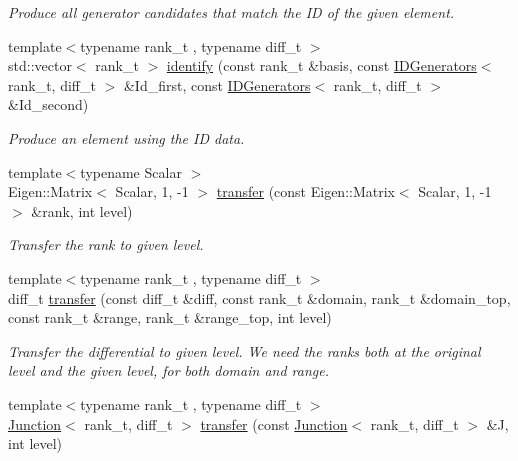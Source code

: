 \begin{DoxyCompactItemize}
\begin{DoxyCompactList}\small\item\em Produce all generator candidates that match the ID of the given element. \end{DoxyCompactList}\item 
{\footnotesize template$<$typename rank\+\_\+t , typename diff\+\_\+t $>$ }\\std\+::vector$<$ rank\+\_\+t $>$ \hyperlink{namespaceMackey_a3fa96ba9b7316a92eca2f5c0bd1cca4d}{identify} (const rank\+\_\+t \&basis, const \hyperlink{classMackey_1_1IDGenerators}{I\+D\+Generators}$<$ rank\+\_\+t, diff\+\_\+t $>$ \&Id\+\_\+first, const \hyperlink{classMackey_1_1IDGenerators}{I\+D\+Generators}$<$ rank\+\_\+t, diff\+\_\+t $>$ \&Id\+\_\+second)
\begin{DoxyCompactList}\small\item\em Produce an element using the ID data. \end{DoxyCompactList}\item 
{\footnotesize template$<$typename Scalar $>$ }\\Eigen\+::\+Matrix$<$ Scalar, 1, -\/1 $>$ \hyperlink{namespaceMackey_a671613d53fc3b0c9c4b115bc8b2797e6}{transfer} (const Eigen\+::\+Matrix$<$ Scalar, 1, -\/1 $>$ \&rank, int level)
\begin{DoxyCompactList}\small\item\em Transfer the rank to given level. \end{DoxyCompactList}\item 
{\footnotesize template$<$typename rank\+\_\+t , typename diff\+\_\+t $>$ }\\diff\+\_\+t \hyperlink{namespaceMackey_ad7524839b58c80d4b2c54827e4833b12}{transfer} (const diff\+\_\+t \&diff, const rank\+\_\+t \&domain, rank\+\_\+t \&domain\+\_\+top, const rank\+\_\+t \&range, rank\+\_\+t \&range\+\_\+top, int level)
\begin{DoxyCompactList}\small\item\em Transfer the differential to given level. We need the ranks both at the original level and the given level, for both domain and range. \end{DoxyCompactList}\item 
{\footnotesize template$<$typename rank\+\_\+t , typename diff\+\_\+t $>$ }\\\hyperlink{classMackey_1_1Junction}{Junction}$<$ rank\+\_\+t, diff\+\_\+t $>$ \hyperlink{namespaceMackey_a914aba7f868e67ae3fd9da3995678660}{transfer} (const \hyperlink{classMackey_1_1Junction}{Junction}$<$ rank\+\_\+t, diff\+\_\+t $>$ \&J, int level)

\end{DoxyCompactItemize}
